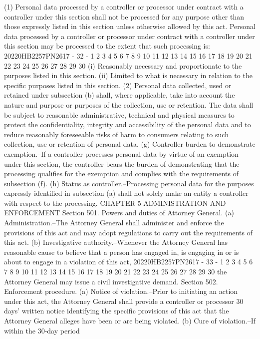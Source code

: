 (1) Personal data processed by a controller or processor
under contract with a controller under this section shall not
be processed for any purpose other than those expressly
listed in this section unless otherwise allowed by this act.
Personal data processed by a controller or processor under
contract with a controller under this section may be
processed to the extent that such processing is:
20220HB2257PN2617 - 32 -
1
2
3
4
5
6
7
8
9
10
11
12
13
14
15
16
17
18
19
20
21
22
23
24
25
26
27
28
29
30
(i) Reasonably necessary and proportionate to the
purposes listed in this section.
(ii) Limited to what is necessary in relation to the
specific purposes listed in this section.
(2) Personal data collected, used or retained under
subsection (b) shall, where applicable, take into account the
nature and purpose or purposes of the collection, use or
retention. The data shall be subject to reasonable
administrative, technical and physical measures to protect
the confidentiality, integrity and accessibility of the
personal data and to reduce reasonably foreseeable risks of
harm to consumers relating to such collection, use or
retention of personal data.
(g) Controller burden to demonstrate exemption.--If a
controller processes personal data by virtue of an exemption
under this section, the controller bears the burden of
demonstrating that the processing qualifies for the exemption
and complies with the requirements of subsection (f).
(h) Status as controller.--Processing personal data for the
purposes expressly identified in subsection (a) shall not solely
make an entity a controller with respect to the processing.
CHAPTER 5
ADMINISTRATION AND ENFORCEMENT
Section 501. Powers and duties of Attorney General.
(a) Administration.--The Attorney General shall administer
and enforce the provisions of this act and may adopt regulations
to carry out the requirements of this act.
(b) Investigative authority.--Whenever the Attorney General
has reasonable cause to believe that a person has engaged in, is
engaging in or is about to engage in a violation of this act,
20220HB2257PN2617 - 33 -
1
2
3
4
5
6
7
8
9
10
11
12
13
14
15
16
17
18
19
20
21
22
23
24
25
26
27
28
29
30
the Attorney General may issue a civil investigative demand.
Section 502. Enforcement procedure.
(a) Notice of violation.--Prior to initiating an action
under this act, the Attorney General shall provide a controller
or processor 30 days' written notice identifying the specific
provisions of this act that the Attorney General alleges have
been or are being violated.
(b) Cure of violation.--If within the 30-day period
